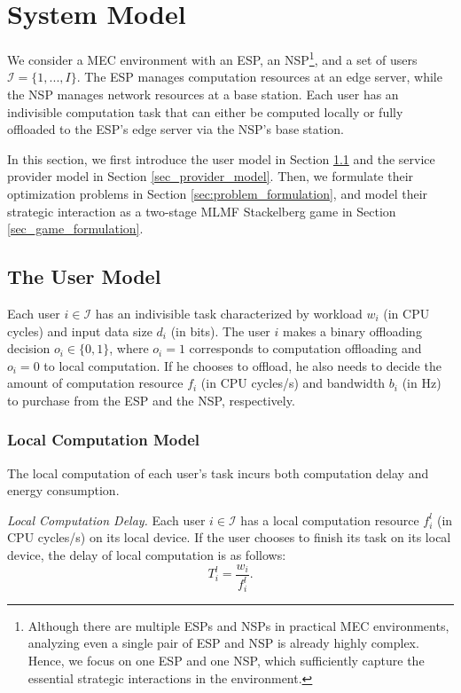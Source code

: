 \documentclass[lettersize,journal]{IEEEtran}
\begin{document}
\section{System Model}\label{section:system_model}
We consider a MEC environment with an ESP, an NSP\footnote{Although there are multiple ESPs and NSPs in practical MEC environments, analyzing even a single pair of ESP and NSP is already highly complex. Hence, we focus on one ESP and one NSP, which sufficiently capture the essential strategic interactions in the environment.}, and a set of users $\mathcal{I}=\{1,...,I\}$.
The ESP manages computation resources at an edge server, while the NSP manages network resources at a base station.
Each user has an indivisible computation task \cite{mach2017mobile} that can either be computed locally or fully offloaded to the ESP's edge server via the NSP's base station. 

In this section, we first introduce the user model in Section  \ref{sec_user_model} and the service provider model in Section \ref{sec_provider_model}. Then, we formulate their optimization problems in Section \ref{sec:problem_formulation}, and model their strategic interaction as a two-stage MLMF Stackelberg game in Section \ref{sec_game_formulation}.

\subsection{The User Model}\label{sec_user_model}
Each user $i\in\mathcal{I}$ has an indivisible task characterized by workload $w_i$ (in CPU cycles) and input data size $d_i$ (in bits). 
The user $i$ makes a binary offloading decision $o_i\in\{0,1\}$, where $o_i=1$ corresponds to computation offloading and $o_i=0$ to local computation.
If he chooses to offload, he also needs to decide the amount of computation resource $f_i$ (in CPU cycles/s) and bandwidth $b_i$ (in Hz) to purchase from the ESP and the NSP, respectively.

\subsubsection{Local Computation Model}
The local computation of each user’s task incurs both computation delay and energy consumption.

\emph{Local Computation Delay.} 
Each user $i\in\mathcal{I}$ has a local computation resource $f^l_i$ (in CPU cycles/s) on its local device.
If the user chooses to finish its task on its local device, the delay of local computation is as follows: 
\begin{equation}
    T^l_i=\frac{w_i}{f^l_i}.
\end{equation}
\end{document}
